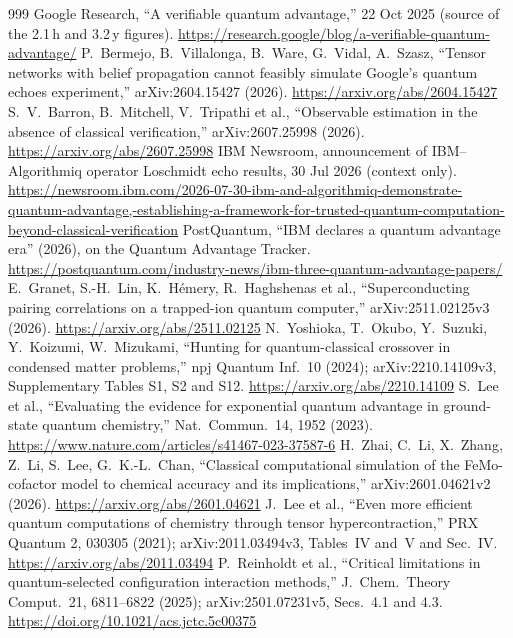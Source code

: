 \documentclass[10pt,a4paper]{article}
\begin{document}
\begin{thebibliography}{999}
 Google Research, ``A verifiable quantum advantage,'' 22 Oct 2025 (source of the 2.1\,h and 3.2\,y figures). \url{https://research.google/blog/a-verifiable-quantum-advantage/}
 P.~Bermejo, B.~Villalonga, B.~Ware, G.~Vidal, A.~Szasz, ``Tensor networks with belief propagation cannot feasibly simulate Google's quantum echoes experiment,'' arXiv:2604.15427 (2026). \url{https://arxiv.org/abs/2604.15427}
 S.~V.~Barron, B.~Mitchell, V.~Tripathi et al., ``Observable estimation in the absence of classical verification,'' arXiv:2607.25998 (2026). \url{https://arxiv.org/abs/2607.25998}
 IBM Newsroom, announcement of IBM--Algorithmiq operator Loschmidt echo results, 30 Jul 2026 (context only). \url{https://newsroom.ibm.com/2026-07-30-ibm-and-algorithmiq-demonstrate-quantum-advantage,-establishing-a-framework-for-trusted-quantum-computation-beyond-classical-verification}
 PostQuantum, ``IBM declares a quantum advantage era'' (2026), on the Quantum Advantage Tracker. \url{https://postquantum.com/industry-news/ibm-three-quantum-advantage-papers/}
 E.~Granet, S.-H.~Lin, K.~H\'emery, R.~Haghshenas et al., ``Superconducting pairing correlations on a trapped-ion quantum computer,'' arXiv:2511.02125v3 (2026). \url{https://arxiv.org/abs/2511.02125}
 N.~Yoshioka, T.~Okubo, Y.~Suzuki, Y.~Koizumi, W.~Mizukami, ``Hunting for quantum-classical crossover in condensed matter problems,'' npj Quantum Inf.\ 10 (2024); arXiv:2210.14109v3, Supplementary Tables S1, S2 and S12. \url{https://arxiv.org/abs/2210.14109}
 S.~Lee et al., ``Evaluating the evidence for exponential quantum advantage in ground-state quantum chemistry,'' Nat.\ Commun.\ 14, 1952 (2023). \url{https://www.nature.com/articles/s41467-023-37587-6}
 H.~Zhai, C.~Li, X.~Zhang, Z.~Li, S.~Lee, G.~K.-L.~Chan, ``Classical computational simulation of the FeMo-cofactor model to chemical accuracy and its implications,'' arXiv:2601.04621v2 (2026). \url{https://arxiv.org/abs/2601.04621}
 J.~Lee et al., ``Even more efficient quantum computations of chemistry through tensor hypercontraction,'' PRX Quantum 2, 030305 (2021); arXiv:2011.03494v3, Tables~IV and~V and Sec.~IV. \url{https://arxiv.org/abs/2011.03494}
 P.~Reinholdt et al., ``Critical limitations in quantum-selected configuration interaction methods,'' J.\ Chem.\ Theory Comput.\ 21, 6811--6822 (2025); arXiv:2501.07231v5, Secs.~4.1 and 4.3. \url{https://doi.org/10.1021/acs.jctc.5c00375}

\end{thebibliography}
\end{document}
